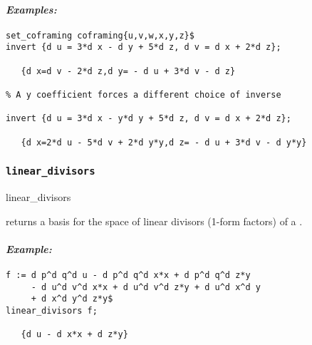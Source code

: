 \paragraph{\it Examples:}
\begin{verbatim}
set_coframing coframing{u,v,w,x,y,z}$
invert {d u = 3*d x - d y + 5*d z, d v = d x + 2*d z};

   {d x=d v - 2*d z,d y= - d u + 3*d v - d z}

% A y coefficient forces a different choice of inverse

invert {d u = 3*d x - y*d y + 5*d z, d v = d x + 2*d z};

   {d x=2*d u - 5*d v + 2*d y*y,d z= - d u + 3*d v - d y*y} 
\end{verbatim}








\subsubsection{\tt linear\_divisors}
\label{linear_divisors}

\begin{edssyntax}
	linear\_divisors 
\end{edssyntax}
returns a basis for the space of linear divisors (1-form factors) of a
.

\paragraph{\it Example:}
\begin{verbatim}
f := d p^d q^d u - d p^d q^d x*x + d p^d q^d z*y
     - d u^d v^d x*x + d u^d v^d z*y + d u^d x^d y
     + d x^d y^d z*y$
linear_divisors f;

   {d u - d x*x + d z*y}
\end{verbatim}

